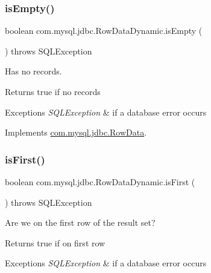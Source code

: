 \subsubsection{\texorpdfstring{is\+Empty()}{isEmpty()}}
{\footnotesize\ttfamily boolean com.\+mysql.\+jdbc.\+Row\+Data\+Dynamic.\+is\+Empty (\begin{DoxyParamCaption}{ }\end{DoxyParamCaption}) throws S\+Q\+L\+Exception}

Has no records.

\begin{DoxyReturn}{Returns}
true if no records 
\end{DoxyReturn}

\begin{DoxyExceptions}{Exceptions}
{\em S\+Q\+L\+Exception} & if a database error occurs \\
\hline
\end{DoxyExceptions}


Implements \mbox{\hyperlink{interfacecom_1_1mysql_1_1jdbc_1_1_row_data_afe25c16468d9db9d9458db7b1c6004f1}{com.\+mysql.\+jdbc.\+Row\+Data}}.

\mbox{\label{classcom_1_1mysql_1_1jdbc_1_1_row_data_dynamic_a7f7a86fb22556f5ed0fdb8a115008c83}} 
\subsubsection{\texorpdfstring{is\+First()}{isFirst()}}
{\footnotesize\ttfamily boolean com.\+mysql.\+jdbc.\+Row\+Data\+Dynamic.\+is\+First (\begin{DoxyParamCaption}{ }\end{DoxyParamCaption}) throws S\+Q\+L\+Exception}

Are we on the first row of the result set?

\begin{DoxyReturn}{Returns}
true if on first row 
\end{DoxyReturn}

\begin{DoxyExceptions}{Exceptions}
{\em S\+Q\+L\+Exception} & if a database error occurs \\
\hline
\end{DoxyExceptions}


